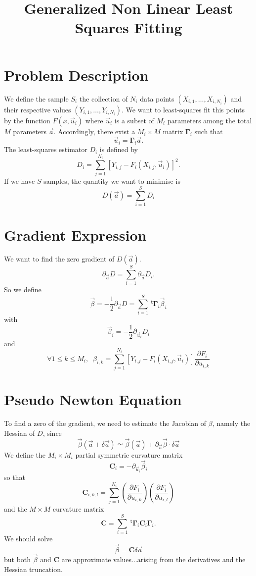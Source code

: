 \documentclass[aps,twocolumn]{revtex4}
\newcommand{\mymat}[1]{\boldsymbol{#1}}
\newcommand{\mytrn}[1]{~^{\mathsf{t}}#1}
\begin{document}
\title{Generalized Non Linear Least Squares Fitting}
\maketitle

\section{Problem Description}
We define the sample $S_i$ the collection of $N_i$ data points $(X_{i,1},\ldots,X_{i,N_i})$
and their respective values $(Y_{i,1},\ldots,Y_{i,N_i})$.
We want to least-squares fit this points by the function $F(x,\vec{u}_i)$
where $\vec{u}_i$ is a subset of $M_i$ parameters among the total $M$ parameters $\vec{a}$.
Accordingly, there exist a $M_i \times M$ matrix $\mymat{\Gamma}_i$ such that
$$
	\vec{u}_i = \mymat{\Gamma}_i \vec{a}.
$$
The least-squares estimator $D_i$ is defined by
$$
	D_i = \sum_{j=1}^{N_i} \left[Y_{i,j} - F_i\left(X_{i,j},\vec{u}_i\right) \right]^2.
$$
If we have $S$ samples,
the quantity we want to minimise is
$$
	D\left(\vec{a}\right) = \sum_{i=1}^S D_i
$$

\section{Gradient Expression}
We want to find the zero gradient of $D(\vec{a})$.
$$
	\partial_{\vec{a}} D = \sum_{i=1}^{S} \partial_{\vec{a}} D_i.
$$
So we define 
$$
	\vec{\beta} = -\dfrac{1}{2} \partial_{\vec{a}} D = \sum_{i=1}^{S} \mytrn{\mymat{\Gamma}}_i \vec{\beta}_i
$$
with
$$
	\vec{\beta}_{i} = -\dfrac{1}{2} \partial_{\vec{u}_i} D_i 
$$
and
$$
	\forall 1 \leq k \leq M_i, \;\; \beta_{i,k} =	 \sum_{j=1}^{N_i}\left[Y_{i,j} - F_i\left(X_{i,j},\vec{u}_i\right) \right]\dfrac{\partial F_i}{\partial u_{i,k}}
$$

\section{Pseudo Newton Equation}
To find a zero of the gradient, we need to estimate the Jacobian of $\beta$, namely the Hessian of $D$, since
$$
	 \vec\beta\left(\vec{a}+\delta\vec{a}\right) \simeq \vec\beta\left(\vec{a}\right) + \partial_{\vec{a}} \vec{\beta} \cdot \delta\vec{a}
$$
We define the $M_i \times M_i$ partial symmetric curvature  matrix 
$$
	\mymat{C}_i = -\partial_{\vec{u}_i} \vec{\beta}_i
$$
so that
$$
	\mymat{C}_{i,k,l} = \sum_{j=1}^{N_i} \left(\dfrac{\partial F_i}{\partial u_{i,k}}\right) \left(\dfrac{\partial F_i}{\partial u_{i,l}}\right)
$$
and the $M\times M$ curvature matrix
$$
	\mymat{C} = \sum_{i=1}^{S} \mytrn{\mymat{\Gamma}}_i \mymat{C}_i \mymat{\Gamma}_i.
$$
We should solve
$$
	\vec{\beta} = \mymat{C} \delta\vec{a}
$$
but both $\vec{\beta}$ and $\mymat{C}$ are approximate values...arising from the derivatives and the Hessian truncation.
\end{document}
